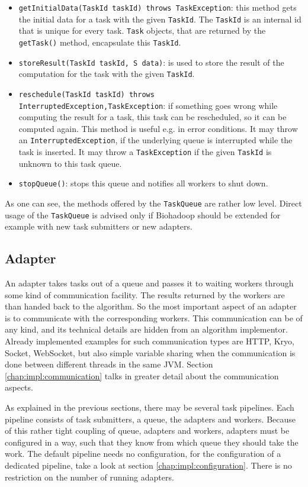 \begin{itemize}
    \item \texttt{getInitialData(TaskId taskId) throws TaskException}: this method gets the initial data for a task with the given \texttt{TaskId}. The \texttt{TaskId} is an internal id that is unique for every task. \texttt{Task} objects, that are returned by the \texttt{getTask()} method, encapsulate this \texttt{TaskId}.
    \item \texttt{storeResult(TaskId taskId, S data)}: is used to store the result of the computation for the task with the given \texttt{TaskId}.
    \item \texttt{reschedule(TaskId taskId) throws InterruptedException,\newline TaskException}: if something goes wrong while computing the result for a task, this task can be rescheduled, so it can be computed again. This method is useful e.g. in error conditions. It may throw an \texttt{InterruptedException}, if the underlying queue is interrupted while the task is inserted. It may throw a \texttt{TaskException} if the given \texttt{TaskId} is unknown to this task queue.
    \item \texttt{stopQueue()}: stops this queue and notifies all workers to shut down.
  \end{itemize}

  As one can see, the methods offered by the \texttt{TaskQueue} are rather low level. Direct usage of the \texttt{TaskQueue} is advised only if Biohadoop should be extended for example with new task submitters or new adapters.
  
  \subsection{Adapter}
  \label{chap:impl:adapter}
  An adapter takes tasks out of a queue and passes it to waiting workers through some kind of communication facility. The results returned by the workers are than handed back to the algorithm. So the most important aspect of an adapter is to communicate with the corresponding workers. This communication can be of any kind, and its technical details are hidden from an algorithm implementor. Already implemented examples for such communication types are HTTP, Kryo, Socket, WebSocket, but also simple variable sharing when the communication is done between different threads in the same JVM. Section \ref{chap:impl:communication} talks in greater detail about the communication aspects.
  
  As explained in the previous sections, there may be several task pipelines. Each pipeline consists of task submitters, a queue, the adapters and workers. Because of this rather tight coupling of queue, adapters and workers, adapters must be configured in a way, such that they know from which queue they should take the work. The default pipeline needs no configuration, for the configuration of a dedicated pipeline, take a look at section \ref{chap:impl:configuration}. There is no restriction on the number of running adapters.
  
